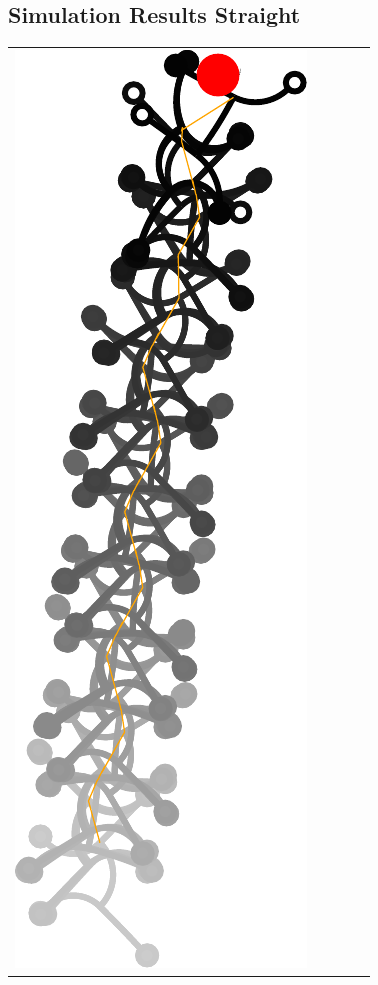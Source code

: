 \documentclass[10pt,a4paper]{article}
\begin{document}
\subsection{Simulation Results Straight}



\begin{tabular}{ccccc}
\includegraphics[scale=.8]{pics/pathplanner_without_noise/example_straight/gait.pdf}
&

\end{tabular}
\end{document}
